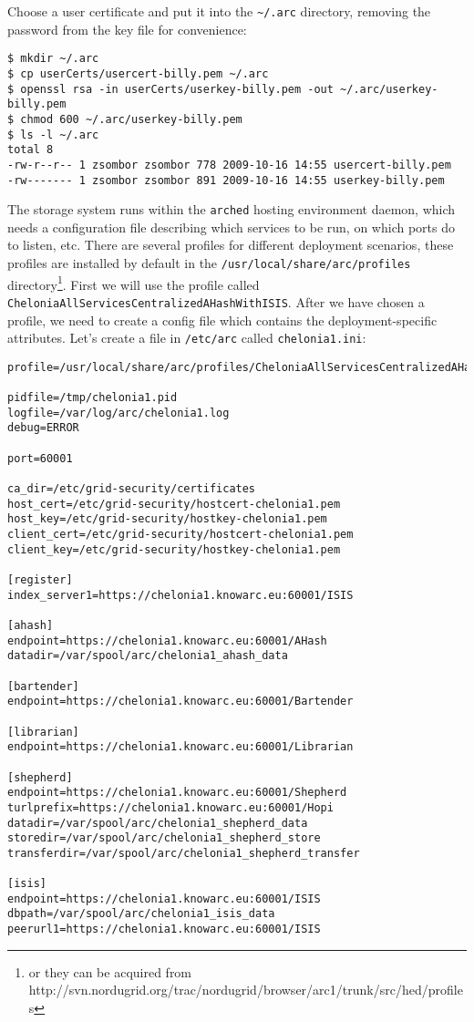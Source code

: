 \documentclass{article}
\begin{document}
Choose a user certificate and put it into the \verb!~/.arc! directory, removing the password from the key file for convenience:

\begin{verbatim}
$ mkdir ~/.arc
$ cp userCerts/usercert-billy.pem ~/.arc
$ openssl rsa -in userCerts/userkey-billy.pem -out ~/.arc/userkey-billy.pem
$ chmod 600 ~/.arc/userkey-billy.pem
$ ls -l ~/.arc
total 8
-rw-r--r-- 1 zsombor zsombor 778 2009-10-16 14:55 usercert-billy.pem
-rw------- 1 zsombor zsombor 891 2009-10-16 14:55 userkey-billy.pem
\end{verbatim}

The storage system runs within the \verb!arched! hosting environment daemon, which needs a configuration file describing which services to be run, on which ports do to listen, etc. There are several profiles for different deployment scenarios, these profiles are installed by default in the \verb!/usr/local/share/arc/profiles! directory\footnote{or they can be acquired from http://svn.nordugrid.org/trac/nordugrid/browser/arc1/trunk/src/hed/profiles}. First we will use the profile called \verb!CheloniaAllServicesCentralizedAHashWithISIS!. After we have chosen a profile, we need to create a config file which contains the deployment-specific attributes. Let's create a file in \verb!/etc/arc! called \verb!chelonia1.ini!:

\begin{verbatim}
profile=/usr/local/share/arc/profiles/CheloniaAllServicesCentralizedAHashWithISIS.xml

pidfile=/tmp/chelonia1.pid
logfile=/var/log/arc/chelonia1.log
debug=ERROR

port=60001

ca_dir=/etc/grid-security/certificates
host_cert=/etc/grid-security/hostcert-chelonia1.pem
host_key=/etc/grid-security/hostkey-chelonia1.pem
client_cert=/etc/grid-security/hostcert-chelonia1.pem
client_key=/etc/grid-security/hostkey-chelonia1.pem

[register]
index_server1=https://chelonia1.knowarc.eu:60001/ISIS

[ahash]
endpoint=https://chelonia1.knowarc.eu:60001/AHash
datadir=/var/spool/arc/chelonia1_ahash_data

[bartender]
endpoint=https://chelonia1.knowarc.eu:60001/Bartender

[librarian]
endpoint=https://chelonia1.knowarc.eu:60001/Librarian

[shepherd]
endpoint=https://chelonia1.knowarc.eu:60001/Shepherd
turlprefix=https://chelonia1.knowarc.eu:60001/Hopi
datadir=/var/spool/arc/chelonia1_shepherd_data
storedir=/var/spool/arc/chelonia1_shepherd_store
transferdir=/var/spool/arc/chelonia1_shepherd_transfer

[isis]
endpoint=https://chelonia1.knowarc.eu:60001/ISIS
dbpath=/var/spool/arc/chelonia1_isis_data
peerurl1=https://chelonia1.knowarc.eu:60001/ISIS
\end{verbatim}
\end{document}
